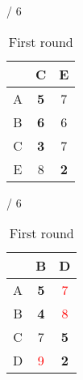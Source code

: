 \documentclass[a4paper, 11 pt, article, accentcolor=tud7b]{tudreport}
\begin{document}
\begin{table}[h]
\begin{subtable}[b]{\textwidth / 6}
\begin{tabular}{| c | c | c |}
	    \hline
	      & C                  & E                  \\ \hline
	    A & \textbf{5}         & 7                  \\ \hline
	    B & \textbf{6}         & 6                  \\ \hline
	    C & \textbf{3}         & 7                  \\ \hline
	    E & 8                  & \textbf{2}         \\ \hline
	    \end{tabular}
	    \caption{$D^{D}$}
	  \end{subtable}
	  \hfill
	  \begin{subtable}[b]{\textwidth / 6}
	    \begin{tabular}{| c | c | c |}
	    \hline
	      & B                   & D                    \\ \hline
	    A & \textbf{5}          & \textcolor{red}{7}   \\ \hline
	    B & \textbf{4}          & \textcolor{red}{8}   \\ \hline
	    C & 7                   & \textbf{5}           \\ \hline
	    D & \textcolor{red}{9}  & \textbf{2}           \\ \hline
	    \end{tabular}
	    \caption{$D^{E}$}
	  \end{subtable}
	  \caption{First round}
	\end{table}
	
\end{document}
